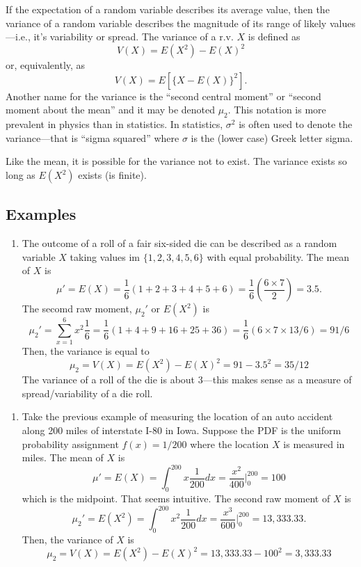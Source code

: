 \documentclass[]{book}
\providecommand{\tightlist}{%
  \setlength{\itemsep}{0pt}\setlength{\parskip}{0pt}}
\begin{document}
If the expectation of a random variable describes its average value,
then the variance of a random variable describes the magnitude of its
range of likely values---i.e., it's variability or spread. The variance
of a r.v. \(X\) is defined as \[V(X) = E(X^2) - E(X)^2\] or,
equivalently, as \[V(X) = E[\{X - E(X)\}^2].\] Another name for the
variance is the ``second central moment'' or ``second moment about the
mean'' and it may be denoted \(\mu_2\). This notation is more prevalent
in physics than in statistics. In statistics, \(\sigma^2\) is often used
to denote the variance---that is ``sigma squared'' where \(\sigma\) is
the (lower case) Greek letter sigma.

Like the mean, it is possible for the variance not to exist. The
variance exists so long as \(E(X^2)\) exists (is finite).

\subsection{Examples}\label{examples-1}

\begin{enumerate}
\def\labelenumi{\arabic{enumi}.}
\tightlist
\item
  The outcome of a roll of a fair six-sided die can be described as a
  random variable \(X\) taking values im \(\{1,2,3,4,5,6\}\) with equal
  probability. The mean of \(X\) is
  \[\mu' = E(X) = \frac{1}{6}(1+2+3+4+5+6) = \frac{1}{6}\left(\frac{6\times 7}{2}\right) = 3.5.\]
  The secomd raw moment, \(\mu_2'\) or \(E(X^2)\) is
  \[\mu_2' = \sum_{x=1}^6 x^2\frac{1}{6} = \frac{1}{6}(1+4+9+16+25+36) = \frac{1}{6}\left(6\times 7\times 13 / 6\right) = 91/6\]
  Then, the variance is equal to
  \[\mu_2 = V(X) = E(X^2) - E(X)^2 = 91-3.5^2 = 35/12\] The variance of
  a roll of the die is about 3---this makes sense as a measure of
  spread/variability of a die roll.
\end{enumerate}

\begin{enumerate}
\def\labelenumi{\arabic{enumi}.}
\setcounter{enumi}{1}
\tightlist
\item
  Take the previous example of measuring the location of an auto
  accident along 200 miles of interstate I-80 in Iowa. Suppose the PDF
  is the uniform probability assignment \(f(x) = 1/200\) where the
  location \(X\) is measured in miles. The mean of \(X\) is
  \[\mu' = E(X) = \int_0^{200} x \frac{1}{200}dx = \frac{x^2}{400}|_0^{200} = 100\]
  which is the midpoint. That seems intuitive. The second raw moment of
  \(X\) is
  \[\mu_2' = E(X^2) = \int_0^{200} x^2 \frac{1}{200}dx = \frac{x^3}{600}|_0^{200} = 13,333.33.\]
  Then, the variance of \(X\) is
  \[\mu_2 = V(X) = E(X^2) - E(X)^2 =  13,333.33 - 100^2 = 3,333.33\] 
\end{enumerate}
\end{document}
